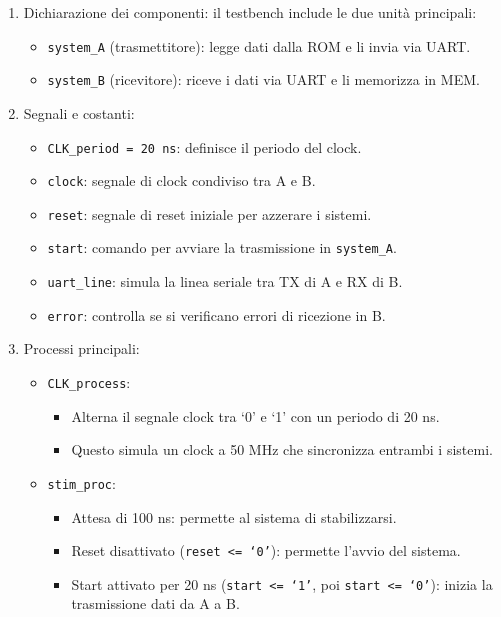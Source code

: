 \begin{enumerate}
    \item Dichiarazione dei componenti: il testbench include le due unità principali:
    \begin{itemize}
        \item \texttt{system\_A} (trasmettitore): legge dati dalla ROM e li invia via UART.
        \item \texttt{system\_B} (ricevitore): riceve i dati via UART e li memorizza in MEM.
    \end{itemize}
    \item Segnali e costanti:
    \begin{itemize}
        \item \texttt{CLK\_period = 20 ns}: definisce il periodo del clock.
        \item \texttt{clock}: segnale di clock condiviso tra A e B.
        \item \texttt{reset}: segnale di reset iniziale per azzerare i sistemi.
        \item \texttt{start}: comando per avviare la trasmissione in \texttt{system\_A}.
        \item \texttt{uart\_line}: simula la linea seriale tra TX di A e RX di B.
        \item \texttt{error}: controlla se si verificano errori di ricezione in B.
    \end{itemize}
    \item Processi principali:
    \begin{itemize}
        \item \texttt{CLK\_process}:
        \begin{itemize}
            \item Alterna il segnale clock tra `0' e `1' con un periodo di 20 ns.
            \item Questo simula un clock a 50 MHz che sincronizza entrambi i sistemi.
        \end{itemize}
        \item \texttt{stim\_proc}:
        \begin{itemize}
            \item Attesa di 100 ns: permette al sistema di stabilizzarsi.
            \item Reset disattivato (\texttt{reset <= `0'}): permette l’avvio del sistema.
            \item Start attivato per 20 ns (\texttt{start <= `1'}, poi \texttt{start <= `0'}): inizia la trasmissione dati da A a B.

\end{itemize}
\end{itemize}
\end{enumerate}
